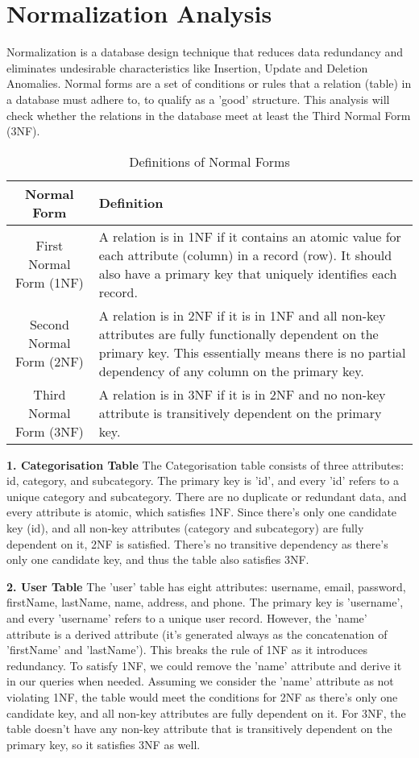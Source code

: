 \chapter{Normalization Analysis}
Normalization is a database design technique that reduces data redundancy and eliminates undesirable characteristics like Insertion, Update and Deletion Anomalies. Normal forms are a set of conditions or rules that a relation (table) in a database must adhere to, to qualify as a 'good' structure. This analysis will check whether the relations in the database meet at least the Third Normal Form (3NF).


\begin{table}[h]
	\centering
	\begin{tabular}{|c|p{10cm}|}
		\hline
		\textbf{Normal Form} & \textbf{Definition} \\
		\hline
		First Normal Form (1NF) & A relation is in 1NF if it contains an atomic value for each attribute (column) in a record (row). It should also have a primary key that uniquely identifies each record. \\
		\hline
		Second Normal Form (2NF) & A relation is in 2NF if it is in 1NF and all non-key attributes are fully functionally dependent on the primary key. This essentially means there is no partial dependency of any column on the primary key. \\
		\hline
		Third Normal Form (3NF) & A relation is in 3NF if it is in 2NF and no non-key attribute is transitively dependent on the primary key. \\
		\hline
	\end{tabular}
	\caption{Definitions of Normal Forms}
	\label{tab:normal_forms}
\end{table}



\textbf{1. Categorisation Table}
The Categorisation table consists of three attributes: id, category, and subcategory. The primary key is 'id', and every 'id' refers to a unique category and subcategory. There are no duplicate or redundant data, and every attribute is atomic, which satisfies 1NF.
Since there's only one candidate key (id), and all non-key attributes (category and subcategory) are fully dependent on it, 2NF is satisfied.
There's no transitive dependency as there's only one candidate key, and thus the table also satisfies 3NF.


\textbf{2. User Table}
The 'user' table has eight attributes: username, email, password, firstName, lastName, name, address, and phone. The primary key is 'username', and every 'username' refers to a unique user record.
However, the 'name' attribute is a derived attribute (it's generated always as the concatenation of 'firstName' and 'lastName'). This breaks the rule of 1NF as it introduces redundancy. To satisfy 1NF, we could remove the 'name' attribute and derive it in our queries when needed.
Assuming we consider the 'name' attribute as not violating 1NF, the table would meet the conditions for 2NF as there's only one candidate key, and all non-key attributes are fully dependent on it.
For 3NF, the table doesn't have any non-key attribute that is transitively dependent on the primary key, so it satisfies 3NF as well.


